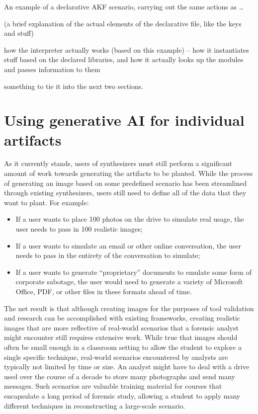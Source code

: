 \documentclass[letterpaper,12pt]{report}
\def\tightlist{}
\begin{document}
An example of a declarative AKF scenario, carrying out the same actions
as \ldots{}

(a brief explanation of the actual elements of the declarative file,
like the keys and stuff)

how the interpreter actually works (based on this example) -- how it
instantiates stuff based on the declared libraries, and how it actually
looks up the modules and passes information to them

something to tie it into the next two sections.

\section{Using generative AI for individual
artifacts}\label{using-generative-ai-for-individual-artifacts}

As it currently stands, users of synthesizers must still perform a
significant amount of work towards generating the artifacts to be
planted. While the process of generating an image based on some
predefined scenario has been streamlined through existing synthesizers,
users still need to define all of the data that they want to plant. For
example:

\begin{itemize}
\tightlist
\item
  If a user wants to place 100 photos on the drive to simulate real
  usage, the user needs to pass in 100 realistic images;
\item
  If a user wants to simulate an email or other online conversation, the
  user needs to pass in the entirety of the conversation to simulate;
\item
  If a user wants to generate ``proprietary'' documents to emulate some
  form of corporate sabotage, the user would need to generate a variety
  of Microsoft Office, PDF, or other files in these formats ahead of
  time.
\end{itemize}

The net result is that although creating images for the purposes of tool
validation and research can be accomplished with existing frameworks,
creating realistic images that are more reflective of real-world
scenarios that a forensic analyst might encounter still requires
extensive work. While true that images should often be small enough in a
classroom setting to allow the student to explore a single specific
technique, real-world scenarios encountered by analysts are typically
not limited by time or size. An analyst might have to deal with a drive
used over the course of a decade to store many photographs and send many
messages. Such scenarios are valuable training material for courses that
encapsulate a long period of forensic study, allowing a student to apply
many different techniques in reconstructing a large-scale scenario.
\end{document}
